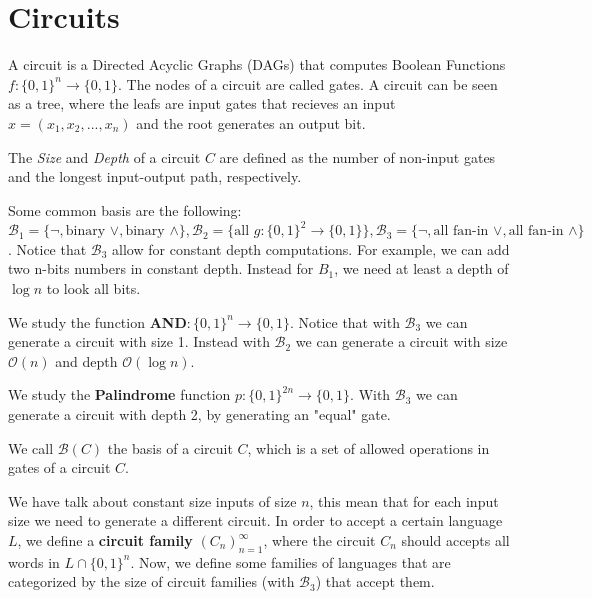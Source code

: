 
\section{Circuits}
\begin{definition}[Circuit]
A circuit is a Directed Acyclic Graphs (DAGs) that computes Boolean Functions $f:\{0,1\}^n \rightarrow\{0,1\}$. The nodes of a circuit are called gates. A circuit can be seen as a tree, where the leafs are input gates that recieves an input $x=(x_1,x_2,...,x_n)$ and the root generates an output bit.     
\end{definition}

\begin{definition}
The \textit{Size} and \textit{Depth} of a circuit $C$ are defined as the number of non-input gates and the longest input-output path, respectively.
\end{definition}

\begin{example}
    Some common basis are the following: $\mathcal{B}_1=\{ \neg, \text{binary } \lor, \text{binary } \land \}, \mathcal{B}_2=\{\text{all } g:\{0,1\}^2 \rightarrow \{0,1\}\}, \mathcal{B}_3=\{\neg, \text{all fan-in } \lor, \text{all fan-in }\land\}$. Notice that $\mathcal{B}_3$ allow for constant depth computations. For example, we can add two n-bits numbers in constant depth. Instead for $B_1$, we need at least a depth of $\log n$ to look all bits.
\end{example}
\begin{example}
    We study the function \textbf{AND}$:\{0,1\}^n\rightarrow \{0,1\}$. Notice that with $\mathcal{B}_3$ we can generate a circuit with size 1. Instead with $\mathcal{B}_2$ we can generate a circuit with size $\mathcal{O}(n)$ and depth $\mathcal{O}(\log n)$. 
\end{example}
\begin{example}
    We study the \textbf{Palindrome} function $p:\{0,1\}^{2n}\rightarrow \{0,1\}$. With $\mathcal{B}_3$ we can generate a circuit with depth 2, by generating an "equal" gate. 
\end{example}

\begin{definition}[Basis]
We call $\mathcal{B}(C)$ the basis of a circuit $C$, which is a set of allowed operations in gates of a circuit $C$.
\end{definition}

We have talk about constant size inputs of size $n$, this mean that for each input size we need to generate a different circuit. In order to accept a certain language $L$, we define a \textbf{circuit family} $(C_n)^{\infty}_{n=1}$, where the circuit $C_n$ should accepts all words in $L \cap \{0,1\}^n$. Now, we define some families of languages that are categorized by the size of circuit families (with $\mathcal{B}_3$) that accept them.

